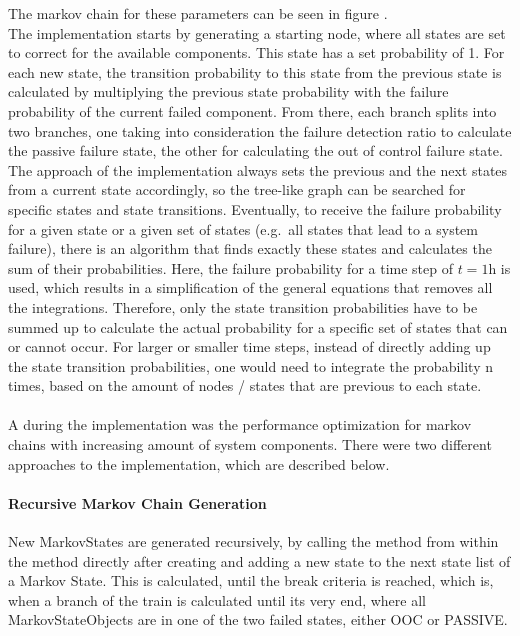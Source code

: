 The markov chain for these parameters can be seen in figure .
\\
The implementation starts by generating a starting node, where all states are set to correct for the available components.
This state has a set probability of 1.
For each new state, the transition probability to this state from the previous state is calculated by multiplying the previous state probability with the
failure probability of the current failed component.
From there, each branch splits into two branches, one taking into consideration the failure detection ratio to calculate the passive failure state, the other for calculating the
out of control failure state.
\\
The approach of the implementation always sets the previous and the next states from a current state accordingly, so the tree-like
graph can be searched for specific states and state transitions.
Eventually, to receive the failure probability for a given state or a given set of states (e.g.\ all states that lead to a system failure), there is an algorithm
that finds exactly these states and calculates the sum of their probabilities.
Here, the failure probability for a time step of $t = 1 \text{h}$ is used, which results in a simplification of the general equations that removes all the integrations.
Therefore, only the state transition probabilities have to be summed up to calculate the actual probability for a specific set of states that can or cannot occur.
For larger or smaller time steps, instead of directly adding up the state transition probabilities, one would need to integrate the probability n times, based on the amount of nodes
/ states that are previous to each state.
\\
\\
A during the implementation was the performance optimization for markov chains with increasing amount of system components.
There were two different approaches to the implementation, which are described below.
\paragraph{Recursive Markov Chain Generation}
New MarkovStates are generated recursively, by calling the method from within the method directly after creating and adding a new state to the next state list of a Markov State.
This is calculated, until the break criteria is reached, which is, when a branch of the train is calculated until its very end, where all MarkovStateObjects are in
one of the two failed states, either OOC or PASSIVE\@.
